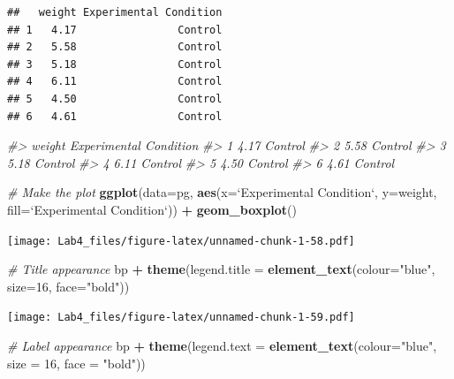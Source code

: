 \documentclass[]{article}
\newenvironment{Shaded}{\begin{snugshade}}{\end{snugshade}}
\newcommand{\KeywordTok}[1]{\textcolor[rgb]{0.13,0.29,0.53}{\textbf{#1}}}
\newcommand{\DataTypeTok}[1]{\textcolor[rgb]{0.13,0.29,0.53}{#1}}
\newcommand{\DecValTok}[1]{\textcolor[rgb]{0.00,0.00,0.81}{#1}}
\newcommand{\StringTok}[1]{\textcolor[rgb]{0.31,0.60,0.02}{#1}}
\newcommand{\CommentTok}[1]{\textcolor[rgb]{0.56,0.35,0.01}{\textit{#1}}}
\newcommand{\OperatorTok}[1]{\textcolor[rgb]{0.81,0.36,0.00}{\textbf{#1}}}
\newcommand{\NormalTok}[1]{#1}
\begin{document}
\begin{verbatim}
##   weight Experimental Condition
## 1   4.17                Control
## 2   5.58                Control
## 3   5.18                Control
## 4   6.11                Control
## 5   4.50                Control
## 6   4.61                Control
\end{verbatim}

\begin{Shaded}
\begin{Highlighting}[]
\CommentTok{#>   weight Experimental Condition}
\CommentTok{#> 1   4.17                Control}
\CommentTok{#> 2   5.58                Control}
\CommentTok{#> 3   5.18                Control}
\CommentTok{#> 4   6.11                Control}
\CommentTok{#> 5   4.50                Control}
\CommentTok{#> 6   4.61                Control}

\CommentTok{# Make the plot }
\KeywordTok{ggplot}\NormalTok{(}\DataTypeTok{data=}\NormalTok{pg, }\KeywordTok{aes}\NormalTok{(}\DataTypeTok{x=}\StringTok{`}\DataTypeTok{Experimental Condition}\StringTok{`}\NormalTok{, }\DataTypeTok{y=}\NormalTok{weight, }\DataTypeTok{fill=}\StringTok{`}\DataTypeTok{Experimental Condition}\StringTok{`}\NormalTok{)) }\OperatorTok{+}
\StringTok{    }\KeywordTok{geom_boxplot}\NormalTok{()}
\end{Highlighting}
\end{Shaded}

\texttt{[image: Lab4\_files/figure-latex/unnamed-chunk-1-58.pdf]}

\begin{Shaded}
\begin{Highlighting}[]
\CommentTok{# Title appearance}
\NormalTok{bp }\OperatorTok{+}\StringTok{ }\KeywordTok{theme}\NormalTok{(}\DataTypeTok{legend.title =} \KeywordTok{element_text}\NormalTok{(}\DataTypeTok{colour=}\StringTok{"blue"}\NormalTok{, }\DataTypeTok{size=}\DecValTok{16}\NormalTok{, }\DataTypeTok{face=}\StringTok{"bold"}\NormalTok{))}
\end{Highlighting}
\end{Shaded}

\texttt{[image: Lab4\_files/figure-latex/unnamed-chunk-1-59.pdf]}

\begin{Shaded}
\begin{Highlighting}[]
\CommentTok{# Label appearance}
\NormalTok{bp }\OperatorTok{+}\StringTok{ }\KeywordTok{theme}\NormalTok{(}\DataTypeTok{legend.text =} \KeywordTok{element_text}\NormalTok{(}\DataTypeTok{colour=}\StringTok{"blue"}\NormalTok{, }\DataTypeTok{size =} \DecValTok{16}\NormalTok{, }\DataTypeTok{face =} \StringTok{"bold"}\NormalTok{))}
\end{Highlighting}
\end{Shaded}
\end{document}
